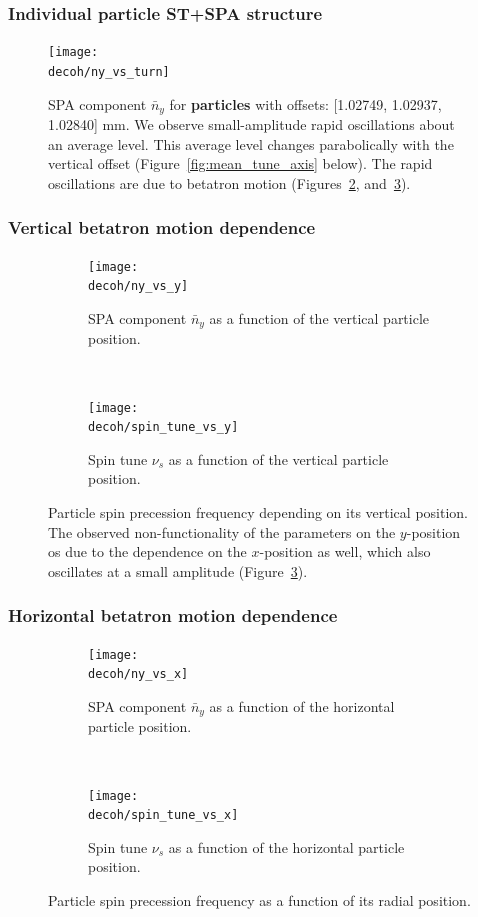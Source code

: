 \documentclass{beamer}
\newcommand{\home}{\string~}
\newcommand{\Artem}{\home/REPOS/COSYINF/img/Artem}
\newcommand{\decoh}{\Artem/decoherence_frequency_dependence}
\begin{document}
\begin{frame}\frametitle{Individual particle ST+SPA structure}
  \begin{figure}[H]
  \centering
  \texttt{[image: \\decoh/ny\_vs\_turn]}
  \caption{SPA component $\bar n_y$ for \textbf{particles} with offsets:
    [1.02749, 1.02937, 1.02840] mm. We observe small-amplitude rapid oscillations about
    an average level. This average level changes parabolically with the vertical
    offset (Figure~\ref{fig:mean_tune_axis} below). The rapid oscillations are
    due to betatron motion (Figures~\ref{fig:tune_axis_position_y},
    and~\ref{fig:tune_axis_position_x}).\label{fig:ny_vs_turn}}
\end{figure}
\end{frame}

\begin{frame}\frametitle{Vertical betatron motion dependence}
  \begin{figure}[H]
    \centering
    \begin{subfigure}[t]{.5\textwidth}
      \texttt{[image: \\decoh/ny\_vs\_y]}
      \caption{SPA component $\bar n_y$ as a function of the vertical particle position.}
    \end{subfigure}~
    \begin{subfigure}[t]{.5\textwidth}
      \texttt{[image: \\decoh/spin\_tune\_vs\_y]}
      \caption{Spin tune $\nu_s$ as a function of the vertical particle position.}
    \end{subfigure}
    \caption{Particle spin precession frequency depending on its vertical position.
      The observed non-functionality of the parameters on the $y$-position os due to the dependence on the $x$-position as well, which also oscillates at a small amplitude (Figure~\ref{fig:tune_axis_position_x}). \label{fig:tune_axis_position_y}}
  \end{figure}
\end{frame}

\begin{frame}\frametitle{Horizontal betatron motion dependence}
  \begin{figure}[H]
    \centering
    \begin{subfigure}[t]{.5\textwidth}
      \texttt{[image: \\decoh/ny\_vs\_x]}
      \caption{SPA component $\bar n_y$ as a function of the horizontal particle position.}
    \end{subfigure}~
    \begin{subfigure}[t]{.5\textwidth}
      \texttt{[image: \\decoh/spin\_tune\_vs\_x]}
      \caption{Spin tune $\nu_s$ as a function of the horizontal particle position.}
    \end{subfigure}
    \caption{Particle spin precession frequency as a function of its radial position.\label{fig:tune_axis_position_x}}
  \end{figure}
\end{frame}
\end{document}
